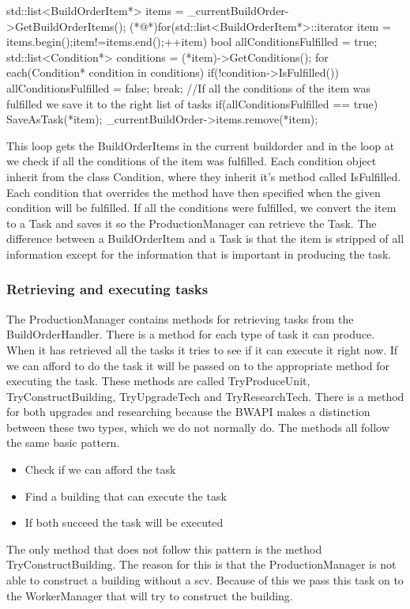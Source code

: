 				\begin{Sourcecode}[caption=BuildOrderHandler main loop]
		std::list<BuildOrderItem*> items = _currentBuildOrder->GetBuildOrderItems();
		(*@\lnote@*)for(std::list<BuildOrderItem*>::iterator item = items.begin();item!=items.end();++item)
		{
			bool allConditionsFulfilled = true;
			std::list<Condition*> conditions = (*item)->GetConditions();
			for each(Condition* condition in conditions)
			{
				if(!condition->IsFulfilled())
				{
					allConditionsFulfilled = false;
					break;
				}
			}
			//If all the conditions of the item was fulfilled we save it to the right list of tasks
			if(allConditionsFulfilled == true)
			{
				SaveAsTask(*item);				
				_currentBuildOrder->items.remove(*item);
			}
		}	
				\end{Sourcecode}
			This loop gets the BuildOrderItems in the current buildorder and in the loop at  we check if all the conditions of the item was 
			fulfilled. Each condition object inherit from the class Condition, where they inherit it's method called IsFulfilled. Each condition that 
			overrides the method have then specified when the given condition will be fulfilled. If all the conditions were fulfilled, we convert the 
			item to a Task and saves it so the ProductionManager can retrieve the Task. The difference between a BuildOrderItem and a Task is that the 
			item is stripped of all information except for the information that is important in producing the task. 
			
		\subsubsection*{Retrieving and executing tasks}
			The ProductionManager contains methods for retrieving tasks from the BuildOrderHandler. There is a method for each type of task it can 
			produce. When it has retrieved all the tasks it tries to see if it can execute it right now. 
			If we can afford to do the task it will be passed on to the appropriate method for executing the task. These 
			methods are called TryProduceUnit, TryConstructBuilding, TryUpgradeTech and TryResearchTech. There is a method for both upgrades and 
			researching because the BWAPI makes a distinction between these two types, which we do not normally do. The methods all follow the same basic 
			pattern.
			\begin{itemize}
				\item Check if we can afford the task
				\item Find a building that can execute the task
				\item If both succeed the task will be executed
			\end{itemize}
			The only method that does not follow this pattern is the method TryConstructBuilding. The reason for this is that the ProductionManager is not 
			able to construct a building without a scv. Because of this we pass this task on to the WorkerManager that will try to construct the building.
			
